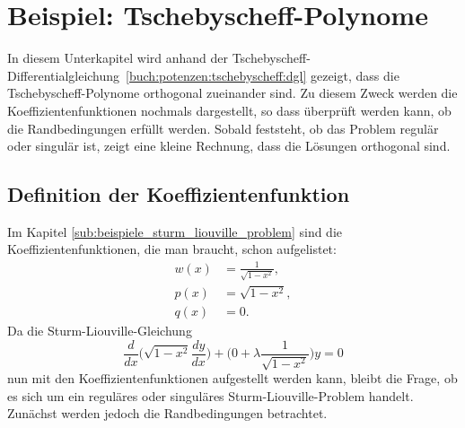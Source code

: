%
%
%

\section{Beispiel: Tschebyscheff-Polynome
\label{sturmliouville:sub:tschebyscheff-polynome}}
In diesem Unterkapitel wird anhand der
Tschebyscheff-Differentialgleichung~\eqref{buch:potenzen:tschebyscheff:dgl}
gezeigt, dass die Tschebyscheff-Polynome orthogonal zueinander sind.
Zu diesem Zweck werden die Koeffizientenfunktionen nochmals dargestellt, so dass
%
überprüft werden kann, ob die Randbedingungen erfüllt werden.
Sobald feststeht, ob das Problem regulär oder singulär ist, zeigt eine
kleine Rechnung, dass die Lösungen orthogonal sind.

\subsection*{Definition der Koeffizientenfunktion}
Im Kapitel \ref{sub:beispiele_sturm_liouville_problem} sind die
Koeffizientenfunktionen, die man braucht, schon aufgelistet:
\begin{align*}
	w(x) &= \frac{1}{\sqrt{1-x^2}}, \\
	p(x) &= \sqrt{1-x^2}, \\
	q(x) &= 0.
\end{align*}
Da die Sturm-Liouville-Gleichung
\begin{equation}
	\label{eq:sturm-liouville-equation-tscheby}
	\frac{d}{dx} \biggl (\sqrt{1-x^2} \frac{dy}{dx}\biggr ) +
	\biggl (0 + \lambda \frac{1}{\sqrt{1-x^2}}\biggr ) y
	=
	0 
\end{equation}
nun mit den Koeffizientenfunktionen aufgestellt werden kann, bleibt die Frage,
ob es sich um ein reguläres oder singuläres Sturm-Liouville-Problem handelt.
Zunächst werden jedoch die Randbedingungen betrachtet.

